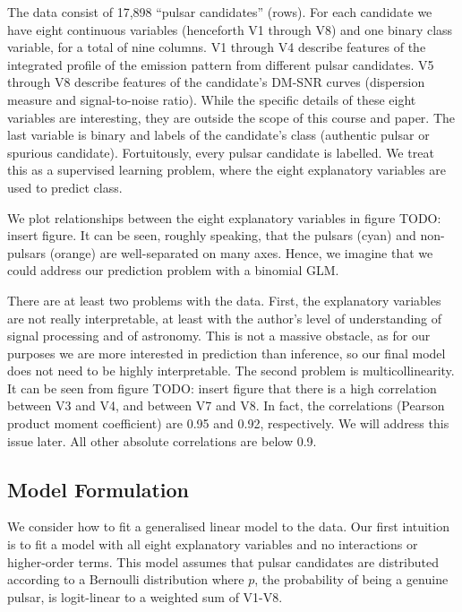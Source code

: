 \documentclass[11pt, oneside]{article}
\begin{document}
The data consist of 17,898 ``pulsar candidates'' (rows). For each candidate we have eight continuous variables (henceforth V1 through V8) and one binary class variable, for a total of nine columns. V1 through V4 describe features of the integrated profile of the emission pattern from different pulsar candidates. V5 through V8 describe features of the candidate's DM-SNR curves (dispersion measure and signal-to-noise ratio). \cite{data} While the specific details of these eight variables are interesting, they are outside the scope of this course and paper. The last variable is binary and labels of the candidate's class (authentic pulsar or spurious candidate). Fortuitously, every pulsar candidate is labelled. We treat this as a supervised learning problem, where the eight explanatory variables are used to predict class. 

We plot relationships between the eight explanatory variables in figure {\color{red} TODO: insert figure}. It can be seen, roughly speaking, that the pulsars (cyan) and non-pulsars (orange) are well-separated on many axes. Hence, we imagine that we could address our prediction problem with a binomial GLM. 

There are at least two problems with the data. First, the explanatory variables are not really interpretable, at least with the author's level of understanding of signal processing and of astronomy. This is not a massive obstacle, as for our purposes we are more interested in prediction than inference, so our final model does not need to be highly interpretable. The second problem is multicollinearity. It can be seen from figure {\color{red} TODO: insert figure} that there is a high correlation between V3 and V4, and between V7 and V8. In fact, the correlations (Pearson product moment coefficient) are 0.95 and 0.92, respectively. We will address this issue later. All other absolute correlations are below 0.9. 

\subsection{Model Formulation}

We consider how to fit a generalised linear model to the data. Our first intuition is to fit a model with all eight explanatory variables and no interactions or higher-order terms. This model assumes that pulsar candidates are distributed according to a Bernoulli distribution where $p$, the probability of being a genuine pulsar, is logit-linear to a weighted sum of V1-V8. 
\end{document}
